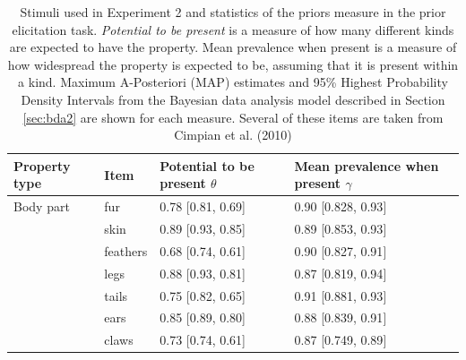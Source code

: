 \documentclass[10pt,letterpaper]{article}
\begin{document}

    
\begin{table}[h]
\centering
\caption{Stimuli used in Experiment 2 and statistics of the priors measure in the prior elicitation task. 
\emph{Potential to be present} is a measure of how many different kinds are expected to have the property. Mean prevalence when present is a measure of how widespread the property is expected to be, assuming that it is present within a kind.
Maximum A-Posteriori (MAP) estimates and 95\% Highest Probability Density Intervals from the Bayesian data analysis model described in Section \ref{sec:bda2} are shown for each measure.
Several of these items are taken from Cimpian et al. (2010)}
\label{tab:novelGenericsStimuli}
\begin{tabular}{| l || l | l | l |}
\hline
Property type     & Item               & Potential to be present $\theta$ & Mean prevalence when present $\gamma$ \\
\hline
\hline
Body part         & fur                & 0.78 {[}0.81, 0.69{]}   & 0.90 {[}0.828, 0.93{]}       \\
                  & skin               & 0.89 {[}0.93, 0.85{]}   & 0.89 {[}0.853, 0.93{]}       \\
                  & feathers           & 0.68 {[}0.74, 0.61{]}   & 0.90 {[}0.827, 0.91{]}       \\
                  & legs               & 0.88 {[}0.93, 0.81{]}   & 0.87 {[}0.819, 0.94{]}       \\
                  & tails              & 0.75 {[}0.82, 0.65{]}   & 0.91 {[}0.881, 0.93{]}       \\
                  & ears               & 0.85 {[}0.89, 0.80{]}   & 0.88 {[}0.839, 0.91{]}       \\
                  & claws              & 0.73 {[}0.74, 0.61{]}   & 0.87 {[}0.749, 0.89{]}       \\

\end{tabular}
\end{table}
\end{document}
